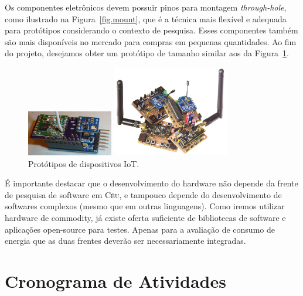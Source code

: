 \documentclass[titlepage,12pt]{article}
\newcommand{\CEU}{\textsc{C\'{e}u}\xspace}
\begin{document}
Os componentes eletrônicos devem possuir pinos para montagem
\emph{through-hole}, como ilustrado na Figura~\ref{fig.mount}, que é a técnica
mais flexível e adequada para protótipos considerando o contexto de pesquisa.
%
Esses componentes também são mais disponíveis no mercado para compras em
pequenas quantidades.
%
Ao fim do projeto, desejamos obter um protótipo de tamanho similar aos da
Figura~\ref{fig.protos}.

\begin{figure}
\begin{minipage}{0.50\textwidth}
\includegraphics[height=75px]{proto-01}
\end{minipage}
\begin{minipage}{0.50\textwidth}
\includegraphics[height=150px]{proto-03}
\end{minipage}
\caption{ Protótipos de dispositivos IoT. \label{fig.protos} }
\end{figure}

É importante destacar que o desenvolvimento do hardware não depende da frente
de pesquisa de software em \CEU, e tampouco depende do desenvolvimento de
softwares complexos (mesmo que em outras linguagens).
Como iremos utilizar hardware de commodity, já existe oferta suficiente de
bibliotecas de software e aplicações open-source para testes.
%
Apenas para a avaliação de consumo de energia que as duas frentes deverão ser
necessariamente integradas.


\section{ Cronograma de Atividades }
\end{document}
